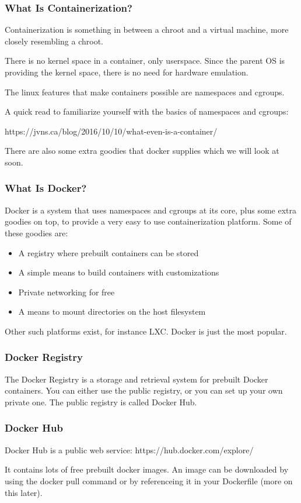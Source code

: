 \documentclass[helvetica,english,utf8,notitle,nologo]{beamer}
\begin{document}
\begin{frame}
  \frametitle{What Is Containerization?}

  Containerization is something in between a chroot and a virtual
  machine, more closely resembling a chroot.

  There is no kernel space in a container, only userspace. Since the
  parent OS is providing the kernel space, there is no need for
  hardware emulation.

  The linux features that make containers possible are namespaces and
  cgroups.

  A quick read to familiarize yourself with the basics of namespaces
  and cgroups:

  https://jvns.ca/blog/2016/10/10/what-even-is-a-container/

  There are also some extra goodies that docker supplies which we will
  look at soon.
\end{frame}

\begin{frame}
  \frametitle{What Is Docker?}

  Docker is a system that uses namespaces and cgroups at its core,
  plus some extra goodies on top, to provide a very easy to use
  containerization platform. Some of these goodies are:

  \begin{itemize}
  \item A registry where prebuilt containers can be stored
  \item A simple means to build containers with customizations
  \item Private networking for free
  \item A means to mount directories on the host filesystem
  \end{itemize}

  Other such platforms exist, for instance LXC. Docker is just the
  most popular.
\end{frame}

\begin{frame}
  \frametitle{Docker Registry}

  The Docker Registry is a storage and retrieval system for prebuilt
  Docker containers. You can either use the public registry, or you
  can set up your own private one. The public registry is called
  Docker Hub.
\end{frame}

\begin{frame}
  \frametitle{Docker Hub}

  Docker Hub is a public web service: https://hub.docker.com/explore/

  It contains lots of free prebuilt docker images. An image can be
  downloaded by using the docker pull command or by referenceing it in
  your Dockerfile (more on this later).
\end{frame}
\end{document}

